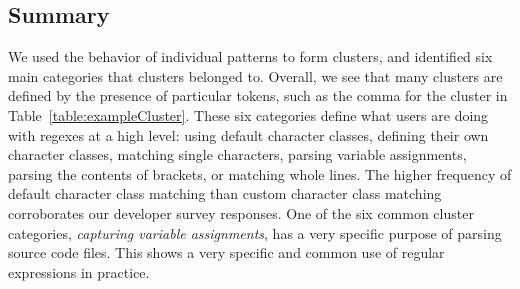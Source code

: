 \subsection{Summary}
\label{sec:clusterResults}
We used the behavior of individual patterns to form clusters, and identified six main categories that clusters belonged to.  Overall, we see that many clusters are defined by the presence of particular tokens, such as the comma for the cluster in Table~\ref{table:exampleCluster}.
These six categories define what users are doing with regexes at a high level: using default character classes, defining their own character classes, matching single characters, parsing variable assignments, parsing the contents of brackets, or matching whole lines. The higher frequency of default character class matching than custom character class matching corroborates our developer survey responses.
 One of the six common cluster categories, \emph{capturing variable assignments}, has a very specific purpose of parsing source code files. This shows a very specific and common use of regular expressions in practice.















